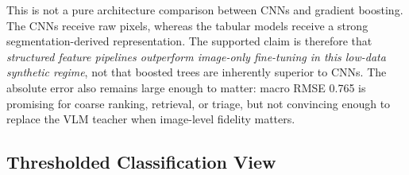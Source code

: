 \documentclass[10pt,twocolumn]{article}
\begin{document}
\begin{table}[t]
\centering
\footnotesize
\caption{Test-set correlation metrics. The mean baseline has zero variance and
therefore zero correlation by construction.}
\label{tab:corr}
\end{table}

This is not a pure architecture comparison between CNNs and gradient boosting.
The CNNs receive raw pixels, whereas the tabular models receive a strong
segmentation-derived representation. The supported claim is therefore that
\emph{structured feature pipelines outperform image-only fine-tuning in this
low-data synthetic regime}, not that boosted trees are inherently superior to
CNNs. The absolute error also remains large
enough to matter: macro RMSE 0.765 is promising for coarse ranking, retrieval,
or triage, but not convincing enough to replace the VLM teacher when
image-level fidelity matters.

\subsection{Thresholded Classification View}
\end{document}
